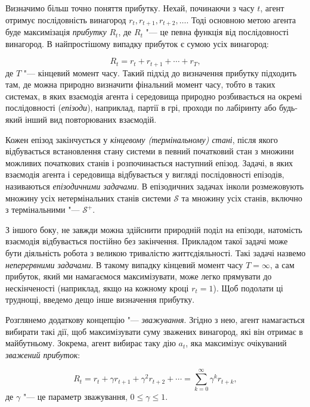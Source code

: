 \documentclass[a4paper,10pt,fleqn]{article}
\begin{document}
Визначимо більш точно поняття прибутку. Нехай, починаючи з часу $t$, агент отримує послідовність винагород $r_{t}, r_{t+1}, r_{t+2}, \ldots$. Тоді основною метою агента буде максимізація \emph{прибутку} $R_t$, де $R_t$ "--- це певна функція від послідовності винагород. В найпростішому випадку прибуток є сумою усіх винагород:

\begin{equation}
R_t = r_{t} + r_{t+1} + \cdots + r_T,
\end{equation}
де $T$ "--- кінцевий момент часу. Такий підхід до визначення прибутку підходить там, де можна природно визначити фінальний момент часу, тобто в таких системах, в яких взаємодія агента і середовища природно розбивається на окремі послідовності (\emph{епізоди}), наприклад, партії в грі, проходи по лабіринту або будь-який інший вид повторюваних взаємодій.

Кожен епізод закінчується у \emph{кінцевому (термінальному) стані}, після якого відбувається встановлення стану системи в певний початковий стан з множини можливих початкових станів і розпочинається наступний епізод. Задачі, в яких взаємодія агента і середовища відбувається у вигляді послідовності епізодів, називаються \emph{епізодичними задачами}. В епізодичних задачах інколи розмежовують множину усіх нетермінальних станів системи $\mathcal{S}$ та множину усіх станів, включно з термінальними "--- $\mathcal{S^+}$.

З іншого боку, не завжди можна здійснити природній поділ на епізоди, натомість взаємодія відбувається постійно без закінчення. Прикладом такої задачі може бути діяльність робота з великою тривалістю життєдіяльності. Такі задачі назвемо \emph{неперервними задачами}. В такому випадку кінцевий момент часу $T=\infty$, а сам прибуток, який ми намагаємося максимізувати, може легко прямувати до нескінченості (наприклад, якщо на кожному кроці $r_t=1$). Щоб подолати ці труднощі, введемо дещо інше визначення прибутку.

Розглянемо додаткову концепцію "--- \emph{зважування}. Згідно з нею, агент намагається вибирати такі дії, щоб максимізувати суму зважених винагород, які він отримає в майбутньому. Зокрема, агент вибирає таку дію $a_t$, яка максимізує очікуваний \emph{зважений прибуток}:

\begin{equation}
R_t = r_{t} + \gamma r_{t+1} + \gamma^2 r_{t+2} + \cdots = \sum_{k=0}^{\infty}\gamma^k r_{t+k},
\end{equation}
де $\gamma$ "--- це параметр зважування, $0\leq\gamma\leq 1$.
\end{document}
